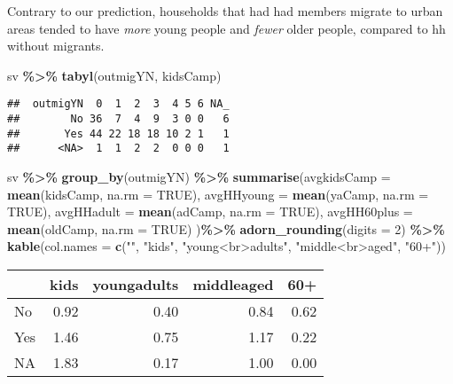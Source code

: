 \documentclass[
]{article}
\newenvironment{Shaded}{\begin{snugshade}}{\end{snugshade}}
\newcommand{\AttributeTok}[1]{\textcolor[rgb]{0.13,0.29,0.53}{#1}}
\newcommand{\ConstantTok}[1]{\textcolor[rgb]{0.56,0.35,0.01}{#1}}
\newcommand{\DecValTok}[1]{\textcolor[rgb]{0.00,0.00,0.81}{#1}}
\newcommand{\FunctionTok}[1]{\textcolor[rgb]{0.13,0.29,0.53}{\textbf{#1}}}
\newcommand{\NormalTok}[1]{#1}
\newcommand{\SpecialCharTok}[1]{\textcolor[rgb]{0.81,0.36,0.00}{\textbf{#1}}}
\newcommand{\StringTok}[1]{\textcolor[rgb]{0.31,0.60,0.02}{#1}}
\begin{document}
Contrary to our prediction, households that had had members migrate to
urban areas tended to have \emph{more} young people and \emph{fewer}
older people, compared to hh without migrants.

\begin{Shaded}
\begin{Highlighting}[]
\NormalTok{sv }\SpecialCharTok{\%\textgreater{}\%} \FunctionTok{tabyl}\NormalTok{(outmigYN, kidsCamp) }
\end{Highlighting}
\end{Shaded}

\begin{verbatim}
##  outmigYN  0  1  2  3  4 5 6 NA_
##        No 36  7  4  9  3 0 0   6
##       Yes 44 22 18 18 10 2 1   1
##      <NA>  1  1  2  2  0 0 0   1
\end{verbatim}

\begin{Shaded}
\begin{Highlighting}[]
\NormalTok{sv }\SpecialCharTok{\%\textgreater{}\%} \FunctionTok{group\_by}\NormalTok{(outmigYN) }\SpecialCharTok{\%\textgreater{}\%} 
 \FunctionTok{summarise}\NormalTok{(}\AttributeTok{avgkidsCamp =} \FunctionTok{mean}\NormalTok{(kidsCamp, }\AttributeTok{na.rm =} \ConstantTok{TRUE}\NormalTok{),}
            \AttributeTok{avgHHyoung =} \FunctionTok{mean}\NormalTok{(yaCamp, }\AttributeTok{na.rm =} \ConstantTok{TRUE}\NormalTok{),}
            \AttributeTok{avgHHadult =} \FunctionTok{mean}\NormalTok{(adCamp, }\AttributeTok{na.rm =} \ConstantTok{TRUE}\NormalTok{),}
            \AttributeTok{avgHH60plus =} \FunctionTok{mean}\NormalTok{(oldCamp, }\AttributeTok{na.rm =} \ConstantTok{TRUE}\NormalTok{)}
\NormalTok{            )}\SpecialCharTok{\%\textgreater{}\%} 
  \FunctionTok{adorn\_rounding}\NormalTok{(}\AttributeTok{digits =} \DecValTok{2}\NormalTok{) }\SpecialCharTok{\%\textgreater{}\%}
  \FunctionTok{kable}\NormalTok{(}\AttributeTok{col.names =} \FunctionTok{c}\NormalTok{(}\StringTok{""}\NormalTok{, }\StringTok{"kids"}\NormalTok{, }\StringTok{"young\textless{}br\textgreater{}adults"}\NormalTok{, }\StringTok{"middle\textless{}br\textgreater{}aged"}\NormalTok{, }\StringTok{"60+"}\NormalTok{))}
\end{Highlighting}
\end{Shaded}

\begin{longtable}[]{@{}lrrrr@{}}
\toprule\noalign{}
& kids & youngadults & middleaged & 60+ \\
\midrule\noalign{}
\endhead
\bottomrule\noalign{}
\endlastfoot
No & 0.92 & 0.40 & 0.84 & 0.62 \\
Yes & 1.46 & 0.75 & 1.17 & 0.22 \\
NA & 1.83 & 0.17 & 1.00 & 0.00 \\
\end{longtable}
\end{document}
